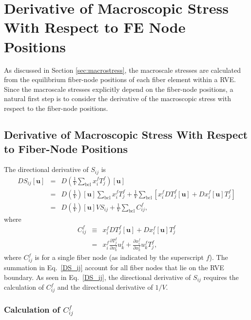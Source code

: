 \section{Derivative of Macroscopic Stress With Respect to FE Node Positions}

As discussed in Section \ref{sec:macrostress}, the macroscale stresses are calculated from the equilibrium fiber-node positions of each fiber element within a RVE. Since the macroscale stresses explicitly depend on the fiber-node positions, a natural first step is to consider the derivative of the macroscopic stress with respect to the fiber-node positions.

\subsection{Derivative of Macroscopic Stress With Respect to Fiber-Node Positions}

The directional derivative of $S_{ij}$ is
%
\begin{eqnarray}
DS_{ij}[\textbf{u}] &=& D\left( \frac{1}{V} \sum_{\text{bcl}} x_i^f T_j^f \right)[\textbf{u}] \nonumber\\
%
&=& D \left(\frac{1}{V}\right) [\textbf{u}]\sum_{\text{bcl}} x_i^f T_j^f + \frac{1}{V} \sum_{\text{bcl}} \left[ x_i^f D T_j^f[\textbf{u}] + D x_i^f  [\textbf{u}]  T_j^f \right]\nonumber\\
%
&=& D \left(\frac{1}{V}\right) [\textbf{u}] V S_{ij} + \frac{1}{V} \sum_{\text{bcl}}  C_{ij}^f,
\label{DS_ij}
\end{eqnarray}
%
where 
%
\begin{eqnarray}
C_{ij}^f &\equiv&   x_i^f D T_j^f[\textbf{u}] + D x_i^f  [\textbf{u}]  T_j^f \nonumber\\
&=& x_i^f \frac{\partial T_j^f}{\partial x_k^f} u_k^f + \frac{\partial x_i^f}{\partial x_k^f}u_k^f T_j^f ,
\label{C_ij}
\end{eqnarray}
%
where $C_{ij}^f$ is for a single fiber node (as indicated by the superscript $f$). The summation in Eq.\ \eqref{DS_ij} account for all fiber nodes that lie on the RVE boundary. As seen in Eq.\ \eqref{DS_ij}, the directional derivative of $S_{ij}$ requires the calculation of $C_{ij}^f$ and the directional derivative of $1/V$. 

\subsubsection{Calculation of $C_{ij}^f$}

